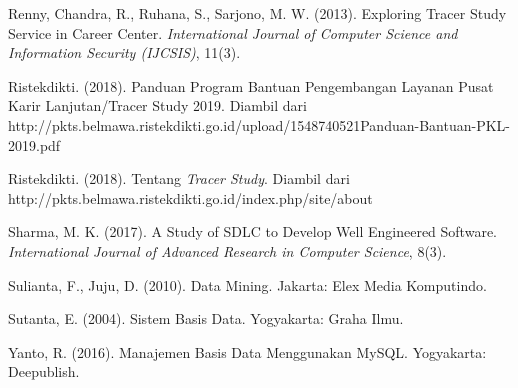 \documentclass{jtetiskripsi}
\begin{document}
\begin{thebibliography}{99}
 Renny, Chandra, R., Ruhana, S., Sarjono, M. W. (2013). Exploring Tracer Study Service in Career Center. \textit{International Journal of Computer Science and Information Security (IJCSIS)}, 11(3).

 Ristekdikti. (2018). Panduan Program Bantuan Pengembangan Layanan Pusat Karir Lanjutan/Tracer Study 2019. Diambil dari http://pkts.belmawa.ristekdikti.go.id/upload/1548740521Panduan-Bantuan-PKL-2019.pdf

 Ristekdikti. (2018). Tentang \textit{Tracer Study}. Diambil dari http://pkts.belmawa.ristekdikti.go.id/index.php/site/about

 Sharma, M. K. (2017). A Study of SDLC to Develop Well Engineered Software. \textit{International Journal of Advanced Research in Computer Science}, 8(3).

 Sulianta, F., Juju, D. (2010). Data Mining. Jakarta: Elex Media Komputindo.

 Sutanta, E. (2004). Sistem Basis Data. Yogyakarta: Graha Ilmu.

 Yanto, R. (2016). Manajemen Basis Data Menggunakan MySQL. Yogyakarta: Deepublish.

	
		
	
\end{thebibliography}



\end{document}
